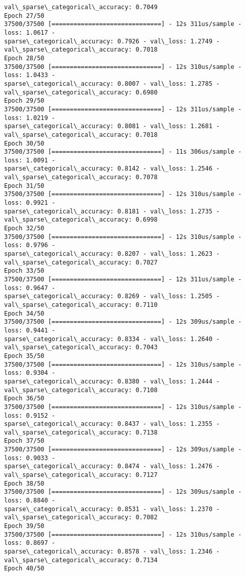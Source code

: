 \documentclass[11pt]{article}
\begin{document}
\begin{Verbatim}[commandchars=\\\{\}]
val\_sparse\_categorical\_accuracy: 0.7049
Epoch 27/50
37500/37500 [==============================] - 12s 311us/sample - loss: 1.0617 -
sparse\_categorical\_accuracy: 0.7926 - val\_loss: 1.2749 -
val\_sparse\_categorical\_accuracy: 0.7018
Epoch 28/50
37500/37500 [==============================] - 12s 310us/sample - loss: 1.0433 -
sparse\_categorical\_accuracy: 0.8007 - val\_loss: 1.2785 -
val\_sparse\_categorical\_accuracy: 0.6980
Epoch 29/50
37500/37500 [==============================] - 12s 311us/sample - loss: 1.0219 -
sparse\_categorical\_accuracy: 0.8081 - val\_loss: 1.2681 -
val\_sparse\_categorical\_accuracy: 0.7018
Epoch 30/50
37500/37500 [==============================] - 11s 306us/sample - loss: 1.0091 -
sparse\_categorical\_accuracy: 0.8142 - val\_loss: 1.2546 -
val\_sparse\_categorical\_accuracy: 0.7078
Epoch 31/50
37500/37500 [==============================] - 12s 310us/sample - loss: 0.9921 -
sparse\_categorical\_accuracy: 0.8181 - val\_loss: 1.2735 -
val\_sparse\_categorical\_accuracy: 0.6998
Epoch 32/50
37500/37500 [==============================] - 12s 310us/sample - loss: 0.9796 -
sparse\_categorical\_accuracy: 0.8207 - val\_loss: 1.2623 -
val\_sparse\_categorical\_accuracy: 0.7027
Epoch 33/50
37500/37500 [==============================] - 12s 311us/sample - loss: 0.9647 -
sparse\_categorical\_accuracy: 0.8269 - val\_loss: 1.2505 -
val\_sparse\_categorical\_accuracy: 0.7110
Epoch 34/50
37500/37500 [==============================] - 12s 309us/sample - loss: 0.9441 -
sparse\_categorical\_accuracy: 0.8334 - val\_loss: 1.2640 -
val\_sparse\_categorical\_accuracy: 0.7043
Epoch 35/50
37500/37500 [==============================] - 12s 310us/sample - loss: 0.9304 -
sparse\_categorical\_accuracy: 0.8380 - val\_loss: 1.2444 -
val\_sparse\_categorical\_accuracy: 0.7108
Epoch 36/50
37500/37500 [==============================] - 12s 310us/sample - loss: 0.9152 -
sparse\_categorical\_accuracy: 0.8437 - val\_loss: 1.2355 -
val\_sparse\_categorical\_accuracy: 0.7138
Epoch 37/50
37500/37500 [==============================] - 12s 309us/sample - loss: 0.9033 -
sparse\_categorical\_accuracy: 0.8474 - val\_loss: 1.2476 -
val\_sparse\_categorical\_accuracy: 0.7127
Epoch 38/50
37500/37500 [==============================] - 12s 309us/sample - loss: 0.8840 -
sparse\_categorical\_accuracy: 0.8531 - val\_loss: 1.2370 -
val\_sparse\_categorical\_accuracy: 0.7082
Epoch 39/50
37500/37500 [==============================] - 12s 310us/sample - loss: 0.8697 -
sparse\_categorical\_accuracy: 0.8578 - val\_loss: 1.2346 -
val\_sparse\_categorical\_accuracy: 0.7134
Epoch 40/50

\end{Verbatim}
\end{document}
